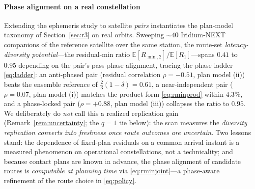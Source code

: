 \documentclass[twocolumn,3p,times,procedia]{elsarticle}
\newcommand{\E}{\mathbb{E}}
\begin{document}
\paragraph*{Phase alignment on a real constellation}
Extending the ephemeris study to satellite \emph{pairs} instantiates
the plan-model taxonomy of Section~\ref{sec:r3} on real orbits.
Sweeping $\sim\!40$ Iridium-NEXT companions of the reference satellite
over the same station, the route-set \emph{latency-diversity
potential}---the residual-min ratio
$\E[R_{\min,2}]/\E[R_1]$---spans $0.41$ to $0.95$ depending on the pair's
pass-phase alignment, tracing the phase ladder \eqref{eq:ladder}: an
anti-phased pair (residual correlation
$\rho{=}{-}0.51$, plan model (ii)) beats the ensemble reference of
$\tfrac23(1-\delta){=}0.61$, a near-independent pair ($\rho{=}0.07$,
plan model (i)) matches the product form \eqref{eq:rminprod} within
$4.3\%$, and a phase-locked pair ($\rho{=}{+}0.88$, plan model (iii))
collapses the ratio
to $0.95$. We deliberately do \emph{not} call this a realized
replication gain (Remark~\ref{rem:uncertainty}; the $q{=}1$ tie
below): the scan measures the \emph{diversity replication converts
into freshness once route outcomes are uncertain}. Two lessons stand: the dependence of
fixed-plan residuals on a common arrival instant is a measured
phenomenon on operational
constellations, not a technicality; and because contact plans are known
in advance, the phase alignment of candidate routes is \emph{computable
at planning time} via \eqref{eq:rminjoint}---a phase-aware refinement of
the route choice in \eqref{eq:policy}.
\end{document}
